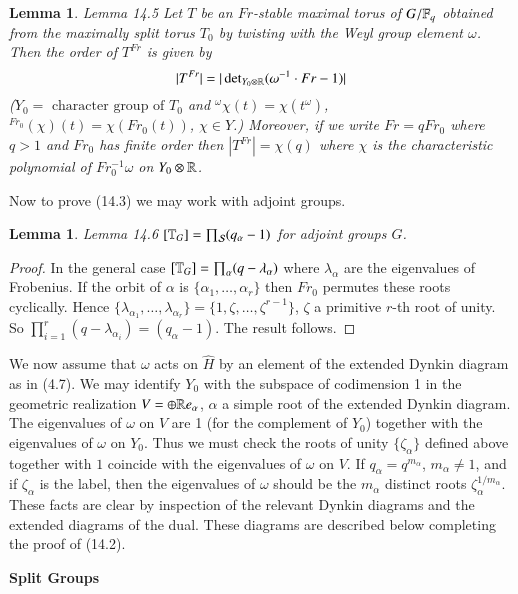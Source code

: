 \documentclass[11pt]{amsart}
\theoremstyle{plain}
\newtheorem{lemma}[theorem]{Lemma}
\theoremstyle{definition}
\def\Re{{\Bbb R}}                          %
\def\what#1{\widehat#1}
\def\CurlyS{{\mathcal S}}
\begin{document}
\begin{lemma}{Lemma 14.5}  Let $T$ be an $Fr$-stable maximal torus of
$G/\Bbb F_q$ obtained from the maximally split torus $T_0$ by
twisting with the Weyl group element $\omega$.  
Then the order of $T^{Fr}$ is given by
$$
|T^{Fr}|=|\operatorname{det}_{Y_0\otimes \Re}(\omega^{-1}\cdot {Fr}-1)|
$$
($Y_0 =\text{ character group of }T_0$ and 
${}^\omega\chi(t)=\chi(t^\omega)$, 
${}^{Fr_0}(\chi)(t) =\chi(Fr_0(t))$, $\chi\in Y$.)
Moreover, if we write $Fr=qFr_0$ where $q>1$ and $Fr_0$ has 
finite order then $|T^{Fr}| = \chi(q)$ where $\chi$ is the 
characteristic polynomial of $Fr_0^{-1}\omega$ on $Y_0\otimes \Re$.
\end{lemma}

Now to prove (14.3) we may work with adjoint groups.

\begin{lemma}{Lemma 14.6} $[\Bbb T_G] =\prod_\CurlyS(q_\alpha -1)$ for adjoint groups
$G$.
\end{lemma}

\begin{proof} In the general case $[\Bbb T_G]=
\prod_\alpha(q-\lambda_\alpha)$ where $\lambda_\alpha$
are the eigenvalues of Frobenius.  If the orbit of $\alpha$
is $\{\alpha_1,\ldots,\alpha_r\}$ then $Fr_0$ permutes these
roots cyclically.  Hence
$\{\lambda_{\alpha_1},\ldots,\lambda_{\alpha_r}\}
=\{1,\zeta,\ldots,\zeta^{r-1}\}$,
$\zeta$ a primitive $r$-th root of unity.  So
$\prod_{i=1}^r(q-\lambda_{\alpha_i}) =
(q_\alpha-1)$.  The result follows.
\end{proof}

We now assume that $\omega$ acts on $\what H$ by an
element of the extended Dynkin diagram as in (4.7).
We may identify $Y_0$ with
the subspace of codimension 1 in the geometric
realization $V=\oplus\Re e_\alpha$, $\alpha$
a simple root of the extended Dynkin diagram.  The
eigenvalues of $\omega$ on $V$ are 1 (for the complement
of $Y_0$) together with the eigenvalues of 
$\omega$ on $Y_0$.
Thus we must check the roots of unity $\{\zeta_\alpha\}$ defined above
together with $1$ coincide with the eigenvalues
of $\omega$ on $V$.
If $q_\alpha=q^{m_\alpha}$, 
$m_\alpha\ne 1$, and if $\zeta_\alpha$ is the label, then
the eigenvalues of $\omega$ should be
the $m_\alpha$ distinct roots $\zeta_\alpha^{1/m_\alpha}$.
These facts are clear by inspection of the relevant Dynkin
diagrams and the extended diagrams of the dual.  These diagrams are
described below completing
the proof of (14.2).
\bigskip
\centerline{\bf Split Groups}\bigskip
\end{document}
